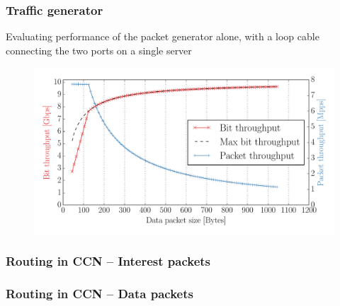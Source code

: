 \begin{frame}[fragile]
  \frametitle{Traffic generator}
  Evaluating performance of the packet generator alone, with a loop cable connecting the two ports on a single server
  \begin{figure}
    \includegraphics[height=.65\textheight]{img/traffgen_increasing_len.pdf}
  \end{figure}
\end{frame}

\begin{frame}[fragile]
  \frametitle{Routing in CCN -- Interest packets}
  \begin{algorithm}[H]
    \DontPrintSemicolon
    
  \end{algorithm}
\end{frame}

\begin{frame}[fragile]
  \frametitle{Routing in CCN -- Data packets}
  \begin{algorithm}[H]
    \DontPrintSemicolon
    
  \end{algorithm}
\end{frame}

